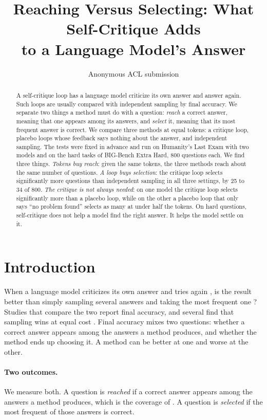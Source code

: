 \documentclass[11pt]{article}
\title{Reaching Versus Selecting: What Self-Critique Adds\\to a Language Model's Answer}
\author{Anonymous ACL submission}
\begin{document}
\maketitle

\begin{abstract}
A self-critique loop has a language model criticize its own answer and answer again.
Such loops are usually compared with independent sampling by final accuracy.
We separate two things a method must do with a question: \emph{reach} a correct answer, meaning that one appears among its answers, and \emph{select} it, meaning that its most frequent answer is correct.
We compare three methods at equal tokens: a critique loop, placebo loops whose feedback says nothing about the answer, and independent sampling.
The tests were fixed in advance and run on Humanity's Last Exam with two models and on the hard tasks of BIG-Bench Extra Hard, 800 questions each.
We find three things.
\emph{Tokens buy reach}: given the same tokens, the three methods reach about the same number of questions.
\emph{A loop buys selection}: the critique loop selects significantly more questions than independent sampling in all three settings, by 25 to 34 of 800.
\emph{The critique is not always needed}: on one model the critique loop selects significantly more than a placebo loop, while on the other a placebo loop that only says ``no problem found'' selects as many at under half the tokens.
On hard questions, self-critique does not help a model find the right answer. It helps the model settle on it.
\end{abstract}

\section{Introduction}

When a language model criticizes its own answer and tries again \citep{madaan2023selfrefine,shinn2023reflexion}, is the result better than simply sampling several answers and taking the most frequent one \citep{wang2023selfconsistency}?
Studies that compare the two report final accuracy, and several find that sampling wins at equal cost \citep{wang2025rethinking,mirzaei2026sample}.
Final accuracy mixes two questions: whether a correct answer appears among the answers a method produces, and whether the method ends up choosing it.
A method can be better at one and worse at the other.

\paragraph{Two outcomes.}
We measure both.
A question is \emph{reached} if a correct answer appears among the answers a method produces, which is the coverage of \citet{brown2024monkeys}.
A question is \emph{selected} if the most frequent of those answers is correct.
\end{document}
